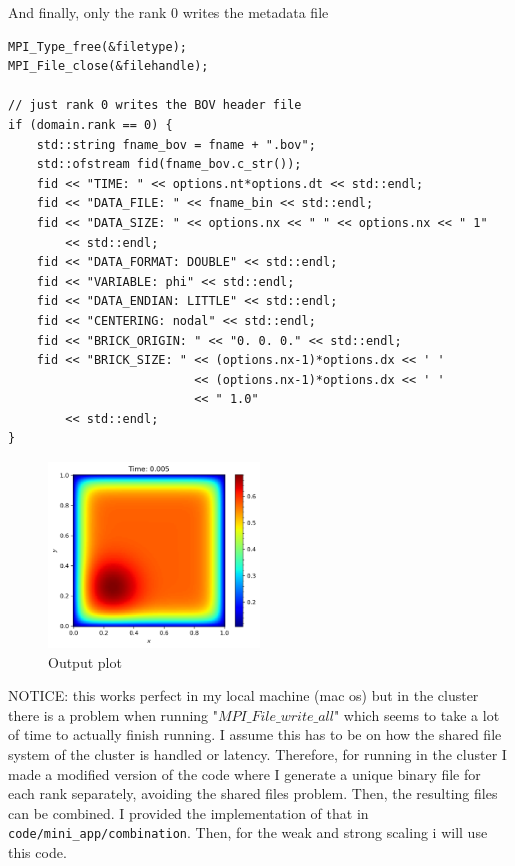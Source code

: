 \documentclass[unicode,11pt,a4paper,oneside,numbers=endperiod,openany]{scrartcl}
\begin{document}
And finally, only the rank 0 writes the metadata file

\begin{verbatim}
MPI_Type_free(&filetype);
MPI_File_close(&filehandle);

// just rank 0 writes the BOV header file
if (domain.rank == 0) {
    std::string fname_bov = fname + ".bov";
    std::ofstream fid(fname_bov.c_str());
    fid << "TIME: " << options.nt*options.dt << std::endl;
    fid << "DATA_FILE: " << fname_bin << std::endl;
    fid << "DATA_SIZE: " << options.nx << " " << options.nx << " 1" 
        << std::endl;
    fid << "DATA_FORMAT: DOUBLE" << std::endl;
    fid << "VARIABLE: phi" << std::endl;
    fid << "DATA_ENDIAN: LITTLE" << std::endl;
    fid << "CENTERING: nodal" << std::endl;
    fid << "BRICK_ORIGIN: " << "0. 0. 0." << std::endl;
    fid << "BRICK_SIZE: " << (options.nx-1)*options.dx << ' '
                          << (options.nx-1)*options.dx << ' '
                          << " 1.0"
        << std::endl;
}
\end{verbatim}

\begin{figure}[h]
  \centering
  \includegraphics[width=0.5\textwidth]{../code/mini_app/output.png}
  \caption{Output plot}
\end{figure}


NOTICE: this works perfect in my local machine (mac os) but in the cluster there is a problem when running "$MPI\_File\_write\_all$"
which seems to take a lot of time to actually finish running. I assume this has to be 
on how the shared file system of the cluster is handled or latency. Therefore, for running in the cluster I made 
a modified version of the code where I generate a unique binary file for each rank separately, avoiding the shared files problem. Then, the 
resulting files can be combined. I provided the implementation of that in \texttt{code/mini\_app/combination}. Then, for the weak and strong scaling i will use this code. 
\end{document}
